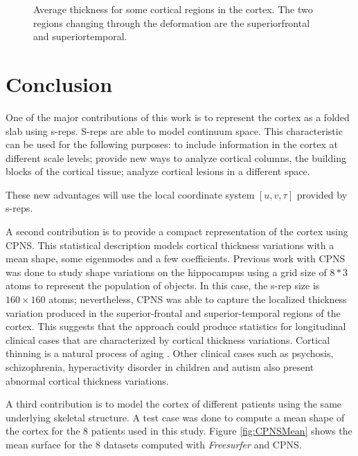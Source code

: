 \documentclass[a4paper,twoside]{article}
\begin{document}
\begin{figure}[htb] 
  \centering
  \caption[Average thickness of the cortex.]{Average thickness for some cortical regions in the cortex. The two regions changing through the deformation
           are the superiorfrontal and superiortemporal.}
  \label{fig:thickness}   
\end{figure}


\section{Conclusion}
\label{sec:Conclusion}

One of the major contributions of this work is to represent the cortex as a folded slab using s-reps. 
S-reps are able to model continuum space. This characteristic can be used 
for the following purposes:
to include information in the cortex at different scale levels; provide 
new ways to analyze cortical columns, the building blocks of the cortical tissue;
analyze cortical lesions in a different space. 

These new advantages will use the local coordinate system $[u,v,\tau]$ provided by s-reps. 

A second contribution is to provide a compact representation of the cortex using CPNS. 
This statistical description models cortical thickness variations with a mean shape, some eigenmodes and a few coefficients.
Previous work with CPNS was done to study shape variations on the hippocampus using a grid size of $8*3$ atoms 
to represent the population of objects.
In this case, the s-rep size is $160 \times 160 $ atoms; nevertheless, CPNS was able to capture the localized thickness variation produced 
in the superior-frontal and superior-temporal regions of the cortex. 
This suggests that the approach could
produce statistics for longitudinal clinical 
cases that are characterized by cortical thickness variations. 
Cortical thinning is a natural process of aging \cite{doi:10.1080/13803390802635174}.
Other clinical cases such as psychosis, schizophrenia, hyperactivity disorder in children and autism
also present abnormal cortical thickness variations.

A third contribution is to model the cortex of different patients using the same underlying skeletal structure.
A test case was done to compute a mean shape of the cortex for the 8 patients used in this study. 
Figure \ref{fig:CPNSMean} shows the mean surface for the 8 datasets computed with \textit{Freesurfer} and
CPNS. 
\end{document}

